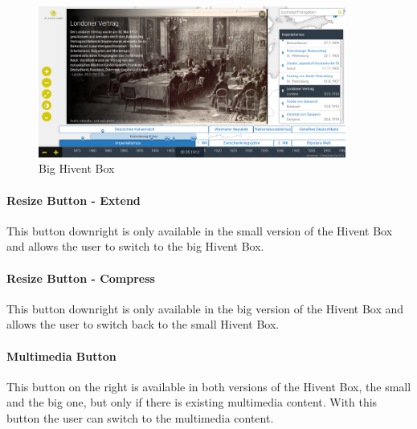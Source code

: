 \begin{figure}[H]
  \begin{center}
    \includegraphics[width=0.9\textwidth]{graphics/hivent_box_big.png}
  \end{center}
  \caption{Big Hivent Box}
  \label{fig:hivent_box_big}
\end{figure}
\label{par:hivent_box_big}

\paragraph{Resize Button - Extend} %
This button downright is only available in the small version of the Hivent Box and allows the user to switch to the big Hivent Box. 
\paragraph{Resize Button - Compress} %
This button downright is only available in the big version of the Hivent Box and allows the user to switch back to the small Hivent Box.
\paragraph{Multimedia Button} %
This button on the right is available in both versions of the Hivent Box, the small and the big one, but only if there is existing multimedia content. With this button the user can switch to the multimedia content.

